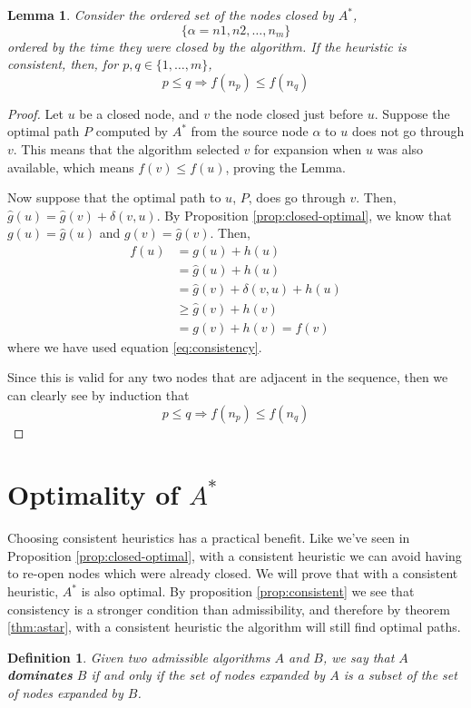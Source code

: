 \documentclass[12pt]{report}
\newtheorem{definition}[theorem]{Definition}
\newtheorem{lemma}[theorem]{Lemma}
\begin{document}
\begin{lemma}
\label{lemma:order}
Consider the ordered set of the nodes closed by $A^*$, 
\[ \{ \alpha = n1, n2, \dots, n_m \} \]
ordered by the time they were closed by the algorithm. If the heuristic is consistent, then, for $p, q \in \{ 1, \dots, m \}$,
\[ p \leq q \Rightarrow f(n_p) \leq f(n_q) \]
\end{lemma}
\begin{proof}
Let $u$ be a closed node, and $v$ the node closed just before $u$. Suppose the optimal path $P$ computed by $A^*$ from the source node $\alpha$ to $u$ does not go through $v$. This means that the algorithm selected $v$ for expansion when $u$ was also available, which means $f(v) \leq f(u)$, proving the Lemma.

Now suppose that the optimal path to $u$, $P$, does go through $v$. Then, $\hat{g}(u) = \hat{g}(v) + \delta(v, u)$. By Proposition \ref{prop:closed-optimal}, we know that $g(u) = \hat{g}(u)$ and $g(v) = \hat{g}(v)$. Then,
\begin{align*}
f(u) &= g(u) + h(u)\\
&= \hat{g}(u) + h(u)\\
&= \hat{g}(v) + \delta(v, u) + h(u)\\
&\geq \hat{g}(v) + h(v)\\
&= g(v) + h(v) = f(v)
\end{align*}
where we have used equation \ref{eq:consistency}.

Since this is valid for any two nodes that are adjacent in the sequence, then we can clearly see by induction that
\[ p \leq q \Rightarrow f(n_p) \leq f(n_q) \]
\end{proof}


\section{Optimality of $A^*$}
Choosing consistent heuristics has a practical benefit. Like we've seen in Proposition \ref{prop:closed-optimal}, with a consistent heuristic we can avoid having to re-open nodes which were already closed. We will prove that with a consistent heuristic, $A^*$ is also optimal. By proposition \ref{prop:consistent} we see that consistency is a stronger condition than admissibility, and therefore by theorem \ref{thm:astar}, with a consistent heuristic the algorithm will still find optimal paths.

\begin{definition}
Given two admissible algorithms $A$ and $B$, we say that $A$ \textbf{dominates} $B$ if and only if the set of nodes expanded by $A$ is a subset of the set of nodes expanded by $B$.
\end{definition}
\end{document}
